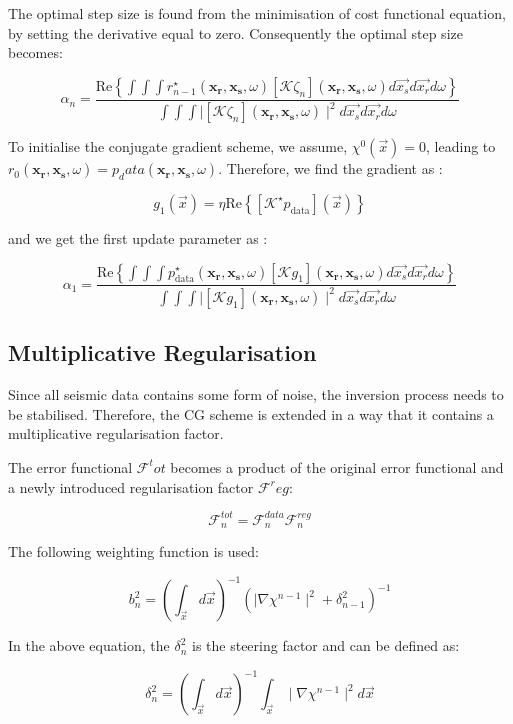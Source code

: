 \documentclass[10pt,a4paper]{article}
\newcommand{\real}[1]{\text{Re} \left\{ #1 \right\}}
\begin{document}
The optimal step size is found from the minimisation of cost functional equation, by setting the derivative equal to zero. Consequently the optimal step size becomes:

\[ \alpha_n = \frac {\real {\int \int \int r^{\star}_{n-1}(\mathbf{x_\text{r}},\mathbf{x_\text{s}},\omega)[\mathcal{K} \zeta_n](\mathbf{x_\text{r}},\mathbf{x_\text{s}},\omega)d\vec{x_s}d\vec{x_r}d\omega}}{\int \int \int \mid[\mathcal{K} \zeta_n](\mathbf{x_\text{r}},\mathbf{x_\text{s}},\omega) \mid^2 d\vec{x_s}d\vec{x_r}d\omega} \]

To initialise the conjugate gradient scheme, we assume, $\chi^0 (\vec{x}) = 0$, leading to $r_0(\mathbf{x_\text{r}},\mathbf{x_\text{s}},\omega) = p_data(\mathbf{x_\text{r}},\mathbf{x_\text{s}},\omega)$. Therefore, we find the gradient as :

\[g_1(\vec{x}) = \eta \real{[\mathcal{K}^\star p_\text{data}](\vec{x})} \]

and we get the first update parameter as :

\[ \alpha_1 = \frac {\real {\int \int \int p^{\star}_\text{data}(\mathbf{x_\text{r}},\mathbf{x_\text{s}},\omega)[\mathcal{K} g_1](\mathbf{x_\text{r}},\mathbf{x_\text{s}},\omega)d\vec{x_s}d\vec{x_r}d\omega}}{\int \int \int \mid[\mathcal{K} g_1](\mathbf{x_\text{r}},\mathbf{x_\text{s}},\omega) \mid^2 d\vec{x_s}d\vec{x_r}d\omega} \]


\subsection{Multiplicative Regularisation}

Since all seismic data contains some form of noise, the inversion process needs to be stabilised. Therefore, the CG scheme is extended in a way that it contains a multiplicative regularisation factor. 

The error functional $\mathcal{F}^tot$ becomes a product of the original error functional and a newly introduced regularisation factor $\mathcal{F}^reg$:

\[ \mathcal{F}^{tot}_n = \mathcal{F}^{data}_n \mathcal{F}^{reg}_n \]

The following weighting function is used:

\[ b_n^{2} = (\int_{\vec{x}} d\vec{x})^{-1} (\mid\nabla\chi^{n-1}\mid^2 + \delta_{n-1}^2)^{-1} \]

In the above equation, the $\delta_{n}^2$ is the steering factor and can be defined as:

\[ \delta_{n}^2 = (\int_{\vec{x}} d\vec{x})^{-1} \int_{\vec{x}} \mid\nabla\chi^{n-1}\mid^2 d\vec{x} \]
\end{document}
